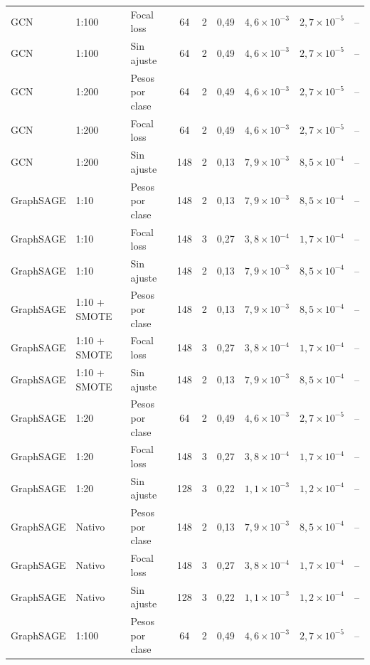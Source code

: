 \begin{longtable}{lllcccccc}
GCN & 1:100 & Focal loss & 64 & 2 & 0{,}49 & $4{,}6 \times 10^{-3}$ & $2{,}7 \times 10^{-5}$ & -- \\
GCN & 1:100 & Sin ajuste & 64 & 2 & 0{,}49 & $4{,}6 \times 10^{-3}$ & $2{,}7 \times 10^{-5}$ & -- \\
GCN & 1:200 & Pesos por clase & 64 & 2 & 0{,}49 & $4{,}6 \times 10^{-3}$ & $2{,}7 \times 10^{-5}$ & -- \\
GCN & 1:200 & Focal loss & 64 & 2 & 0{,}49 & $4{,}6 \times 10^{-3}$ & $2{,}7 \times 10^{-5}$ & -- \\
GCN & 1:200 & Sin ajuste & 148 & 2 & 0{,}13 & $7{,}9 \times 10^{-3}$ & $8{,}5 \times 10^{-4}$ & -- \\
\midrule
GraphSAGE & 1:10 & Pesos por clase & 148 & 2 & 0{,}13 & $7{,}9 \times 10^{-3}$ & $8{,}5 \times 10^{-4}$ & -- \\
GraphSAGE & 1:10 & Focal loss & 148 & 3 & 0{,}27 & $3{,}8 \times 10^{-4}$ & $1{,}7 \times 10^{-4}$ & -- \\
GraphSAGE & 1:10 & Sin ajuste & 148 & 2 & 0{,}13 & $7{,}9 \times 10^{-3}$ & $8{,}5 \times 10^{-4}$ & -- \\
GraphSAGE & 1:10 + SMOTE & Pesos por clase & 148 & 2 & 0{,}13 & $7{,}9 \times 10^{-3}$ & $8{,}5 \times 10^{-4}$ & -- \\
GraphSAGE & 1:10 + SMOTE & Focal loss & 148 & 3 & 0{,}27 & $3{,}8 \times 10^{-4}$ & $1{,}7 \times 10^{-4}$ & -- \\
GraphSAGE & 1:10 + SMOTE & Sin ajuste & 148 & 2 & 0{,}13 & $7{,}9 \times 10^{-3}$ & $8{,}5 \times 10^{-4}$ & -- \\
GraphSAGE & 1:20 & Pesos por clase & 64 & 2 & 0{,}49 & $4{,}6 \times 10^{-3}$ & $2{,}7 \times 10^{-5}$ & -- \\
GraphSAGE & 1:20 & Focal loss & 148 & 3 & 0{,}27 & $3{,}8 \times 10^{-4}$ & $1{,}7 \times 10^{-4}$ & -- \\
GraphSAGE & 1:20 & Sin ajuste & 128 & 3 & 0{,}22 & $1{,}1 \times 10^{-3}$ & $1{,}2 \times 10^{-4}$ & -- \\
GraphSAGE & Nativo & Pesos por clase & 148 & 2 & 0{,}13 & $7{,}9 \times 10^{-3}$ & $8{,}5 \times 10^{-4}$ & -- \\
GraphSAGE & Nativo & Focal loss & 148 & 3 & 0{,}27 & $3{,}8 \times 10^{-4}$ & $1{,}7 \times 10^{-4}$ & -- \\
GraphSAGE & Nativo & Sin ajuste & 128 & 3 & 0{,}22 & $1{,}1 \times 10^{-3}$ & $1{,}2 \times 10^{-4}$ & -- \\
GraphSAGE & 1:100 & Pesos por clase & 64 & 2 & 0{,}49 & $4{,}6 \times 10^{-3}$ & $2{,}7 \times 10^{-5}$ & -- \\

\end{longtable}
